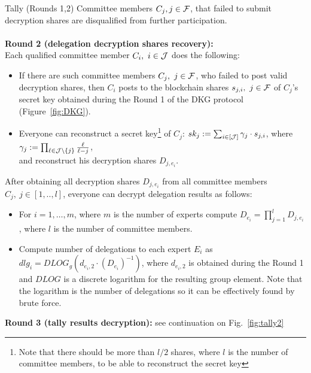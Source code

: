 \begin{boxfig}{\label{fig:tally1}Tally (Rounds 1,2)}{}
Committee members $C_j, j \in \mathcal{F}$, that failed to submit decryption shares are disqualified from further participation.
\\~\\
\textbf{Round 2 (delegation decryption shares recovery):}\\
Each qualified committee member $C_i,\ i \in \mathcal{J}$ does the following:
\begin{itemize}
    \item If there are such committee members $C_j,\ j \in \mathcal{F}$, who failed to post valid decryption shares, then $C_i$ posts to the blockchain shares $s_{j,i},\ j \in \mathcal{F}$ of $C_j$'s secret key obtained during the Round 1 of the DKG protocol (Figure~\ref{fig:DKG}).
    \item Everyone can reconstruct a secret key\footnote{Note that there should be more than $l/2$ shares, where $l$ is the number of committee members, to be able to reconstruct the secret key} of $C_j$: $sk_j := \sum_{i\in[\mathcal{J}]} \gamma_{j} \cdot s_{j,i}$, where $\gamma_{j}:= \prod_{\ell\in \mathcal{J}\setminus \{j\} } \frac{\ell}{\ell-j}$,\\
    and reconstruct his decryption shares $D_{j,e_i}$.
\end{itemize}
\vspace*{2mm}
After obtaining all decryption shares $D_{j,e_i}$ from all committee members $C_j,\ j\in[1,..,l]$, everyone can decrypt delegation results as follows:
\begin{itemize}
    \item For $i = 1,\ldots, m$, where $m$ is the number of experts compute $D_{e_i}=\prod_{j=1}^{l} D_{j,e_i}$, where $l$ is the number of committee members.
    \item Compute number of delegations to each expert $E_i$ as $dlg_{i}=DLOG_g(d_{e_i,2} \cdot (D_{e_i})^{-1})$, where $d_{e_i,2}$ is obtained during the Round 1 and $DLOG$ is a discrete logarithm for the resulting group element. Note that the logarithm is the number of delegations so it can be effectively found by brute force.\\
\end{itemize}
\textbf{Round 3 (tally results decryption):} see continuation on Fig.~\ref{fig:tally2}
\end{boxfig}


